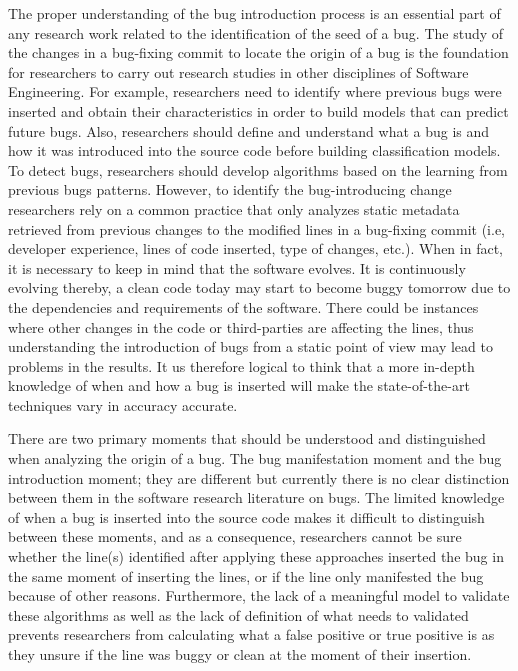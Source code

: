 \documentclass[a4paper, 12pt]{book}
\begin{document}
The proper understanding of the bug introduction process is an essential part of any research work related to the identification of the seed of a bug. The study of the changes in a bug-fixing commit to locate the origin of a bug is the foundation for researchers to carry out research studies in other disciplines of Software Engineering. For example, researchers need to identify where previous bugs were inserted and obtain their characteristics in order to build models that can predict future bugs. Also, researchers should define and understand what a bug is and how it was introduced into the source code before building classification models. To detect bugs, researchers should develop algorithms based on the learning from previous bugs patterns. However, to identify the bug-introducing change researchers rely on a common practice that only analyzes static metadata retrieved from previous changes to the modified lines in a bug-fixing commit (i.e, developer experience, lines of code inserted, type of changes, etc.). When in fact, it is necessary to keep in mind that the software evolves. It is continuously evolving thereby, a clean code today may start to become buggy tomorrow due to the dependencies and requirements of the software. There could be instances where other changes in the code or third-parties are affecting the lines, thus understanding the introduction of bugs from a static point of view may lead to problems in the results. It us therefore logical to think that a more in-depth knowledge of when and how a bug is inserted will make the state-of-the-art techniques vary in accuracy accurate. %

There are two primary moments that should be understood and distinguished when analyzing the origin of a bug. The bug manifestation moment and the bug introduction moment; they are different but currently there is no clear distinction between them in the software research literature on bugs. The limited knowledge of when a bug is inserted into the source code makes it difficult to distinguish between these moments, and as a consequence, researchers cannot be sure whether the line(s) identified after applying these approaches inserted the bug in the same moment of inserting the lines, or if the line only manifested the bug because of other reasons. Furthermore, the lack of a meaningful model to validate these algorithms as well as the lack of definition of what needs to validated prevents researchers from calculating what a false positive or true positive is as they unsure if the line was buggy or clean at the moment of their insertion.
\end{document}

